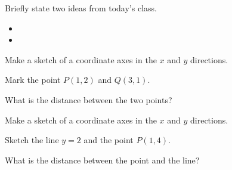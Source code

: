 \postClass

\begin{problem}
\item Briefly state two ideas from today's class.
  \begin{itemize}
  \item
  \item
  \end{itemize}
\item
  \begin{subproblem}
    \item
  \end{subproblem}
\end{problem}


\begin{problem}
\item Make a sketch of a coordinate axes in the $x$ and $y$ directions.
  \vfill
\begin{subproblem}
  \item Mark the point $P(1,2)$ and $Q(3,1)$.
  \item What is the distance between the two points?
    \vspace{3em}
\end{subproblem}

\item Make a sketch of a coordinate axes in the $x$ and $y$ directions.
  \vfill
\begin{subproblem}
  \item Sketch the line $y=2$ and the point $P(1,4)$.
  \item What is the distance between the point and the line?
    \vspace{3em}
\end{subproblem}


\end{problem}


